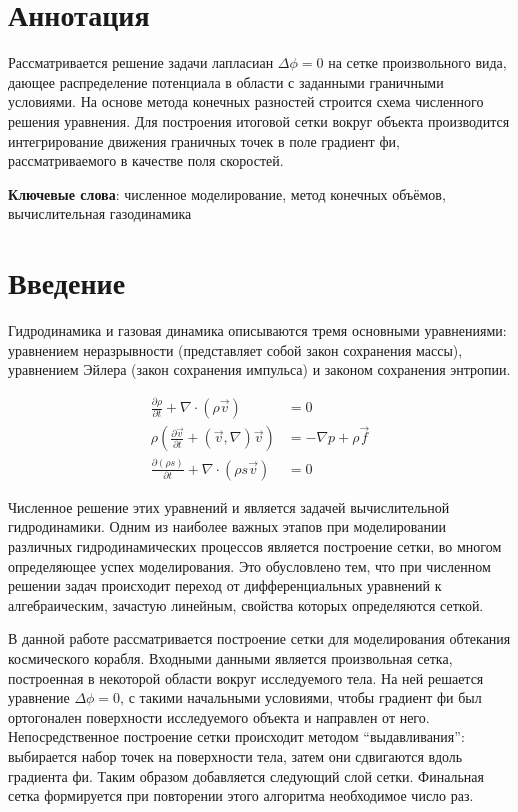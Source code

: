 \documentclass[a4paper,12pt]{article}
\begin{document}


\section*{Аннотация}

Рассматривается решение задачи лапласиан $\Delta \phi = 0$ на сетке произвольного вида, дающее распределение потенциала в области с заданными граничными условиями. На основе метода конечных разностей строится схема численного решения уравнения. Для построения итоговой сетки вокруг объекта производится интегрирование движения граничных точек в поле градиент фи, рассматриваемого в качестве поля скоростей.

\textbf{Ключевые слова}: численное моделирование, метод конечных объёмов, вычислительная газодинамика

\section{Введение}

Гидродинамика и газовая динамика описываются тремя основными уравнениями: уравнением неразрывности (представляет собой закон сохранения массы), уравнением Эйлера (закон сохранения импульса) и законом сохранения энтропии.

\begin{align}
    \frac{\partial \rho}{\partial t} + \nabla \cdot \left( \rho \vec v \right) &= 0 \\
    \rho \left( \frac{\partial \vec v}{\partial t} + (\vec v, \nabla) \vec v \right) &= - \nabla p + \rho \vec f \\
    \frac{\partial (\rho s)}{\partial t} + \nabla \cdot (\rho s \vec v) &= 0
\end{align}

Численное решение этих уравнений и является задачей вычислительной гидродинамики. Одним из наиболее важных этапов при моделировании различных гидродинамических процессов является построение сетки, во многом определяющее успех моделирования.  Это обусловлено тем, что при численном решении задач происходит переход от дифференциальных уравнений к алгебраическим, зачастую линейным, свойства которых определяются сеткой.

В данной работе рассматривается построение сетки для моделирования обтекания космического корабля. Входными данными является произвольная сетка, построенная в некоторой области вокруг исследуемого тела. На ней решается уравнение $\Delta \phi = 0$, с такими начальными условиями, чтобы градиент фи был ортогонален поверхности исследуемого объекта и направлен от него. Непосредственное построение сетки происходит методом “выдавливания”: выбирается набор точек на поверхности тела, затем они сдвигаются вдоль градиента фи. Таким образом добавляется следующий слой сетки. Финальная сетка формируется при повторении этого алгоритма необходимое число раз.
\end{document}
